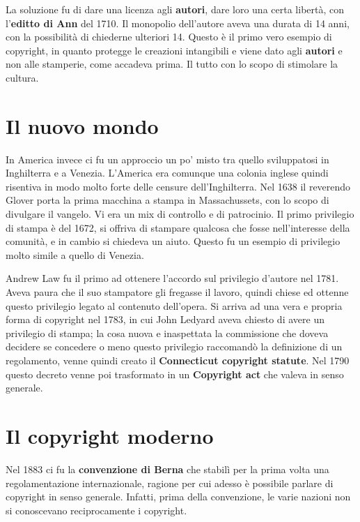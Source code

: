La soluzione fu di dare una licenza agli \textbf{autori}, dare loro una certa libertà, con l'\textbf{editto di Ann} del 1710. Il monopolio dell'autore aveva una durata di 14 anni, con la possibilità di chiederne ulteriori 14. Questo è il primo vero esempio di copyright, in quanto protegge le creazioni intangibili e viene dato agli \textbf{autori} e non alle stamperie, come accadeva prima. Il tutto con lo scopo di stimolare la cultura.

\section{Il nuovo mondo}

In America invece ci fu un approccio un po' misto tra quello sviluppatosi in Inghilterra e a Venezia. L'America era comunque una colonia inglese quindi risentiva in modo molto forte delle censure dell'Inghilterra. Nel 1638 il reverendo Glover porta la prima macchina a stampa in Massachussets, con lo scopo di divulgare il vangelo. Vi era un mix di controllo e di patrocinio.  Il primo privilegio di stampa è del 1672, si offriva di stampare qualcosa che fosse nell'interesse della comunità, e in cambio si chiedeva un aiuto. Questo fu un esempio di privilegio molto simile a quello di Venezia. 

Andrew Law fu il primo ad ottenere l'accordo sul privilegio d'autore nel 1781. Aveva paura che il suo stampatore gli fregasse il lavoro, quindi chiese ed ottenne questo privilegio legato al contenuto dell'opera. Si arriva ad una vera e propria forma di copyright nel 1783, in cui John Ledyard aveva chiesto di avere un privilegio di stampa; la cosa nuova e inaspettata la commissione che doveva decidere se concedere o meno questo privilegio raccomandò la definizione di un regolamento, venne quindi creato il \textbf{Connecticut copyright statute}. Nel 1790 questo decreto venne poi trasformato in un \textbf{Copyright act} che valeva in senso generale.

\section{Il copyright moderno}

Nel 1883 ci fu la \textbf{convenzione di Berna} che stabilì per la prima volta una regolamentazione internazionale, ragione per cui adesso è possibile parlare di copyright in senso generale. Infatti, prima della convenzione, le varie nazioni non si conoscevano reciprocamente i copyright. 

